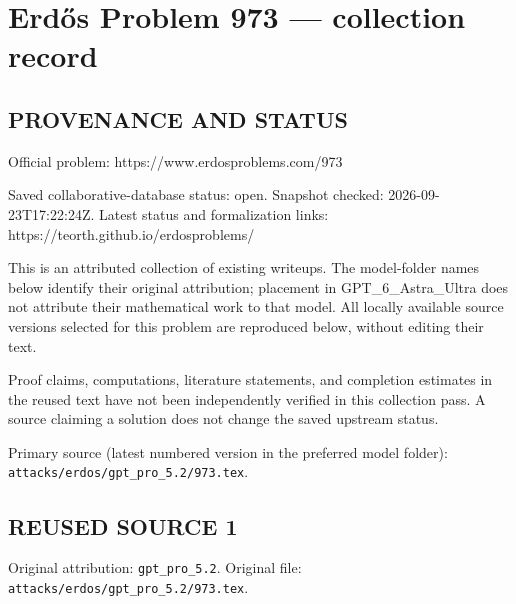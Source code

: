 \section*{Erd\H{o}s Problem 973 --- collection record}

\subsection*{PROVENANCE AND STATUS}
Official problem: https://www.erdosproblems.com/973

Saved collaborative-database status: open.
Snapshot checked: 2026-09-23T17:22:24Z.
Latest status and formalization links: https://teorth.github.io/erdosproblems/

This is an attributed collection of existing writeups. The model-folder names below identify their original attribution; placement in GPT\_6\_Astra\_Ultra does not attribute their mathematical work to that model. All locally available source versions selected for this problem are reproduced below, without editing their text.

Proof claims, computations, literature statements, and completion estimates in the reused text have not been independently verified in this collection pass. A source claiming a solution does not change the saved upstream status.

Primary source (latest numbered version in the preferred model folder): \texttt{attacks/erdos/gpt\_pro\_5.2/973.tex}.

\subsection*{REUSED SOURCE 1}
Original attribution: \texttt{gpt\_pro\_5.2}.
Original file: \texttt{attacks/erdos/gpt\_pro\_5.2/973.tex}.


